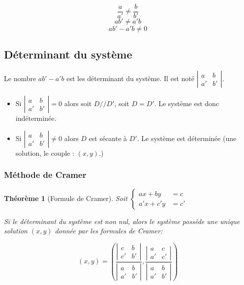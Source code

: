 \documentclass[a4paper,10pt]{report}
\newtheorem{theo}{Théorème}
\begin{document}
$$\frac{a}{a'} \neq \frac{b}{b'}$$
$$ab' \neq a'b$$
$$ab' - a'b \neq 0$$

\subsection{Déterminant du système}
Le nombre $ab' - a'b$ est les déterminant du système. Il est noté $\left| \begin{matrix}
a & b \\
a' & b'
\end{matrix} \right|$.
\begin{itemize}
\item{
Si $\left| \begin{matrix}
a & b \\
a' & b'
\end{matrix} \right| = 0$ alors soit $D // D'$, soit $D = D'$. Le système est donc indéterminée.}
\item{
Si $\left| \begin{matrix}
a & b \\
a' & b'
\end{matrix} \right| \neq 0$ alors $D$ est sécante à $D'$. Le système est déterminée (une solution, le couple : $(x,y)$.)}
\end{itemize}

\subsubsection{Méthode de Cramer}

\begin{theo}[Formule de Cramer]
Soit $\left\{\begin{array}{ll}
 ax+by & = c\\
 a'x+c'y & = c'
 \end{array}\right.$

Si le déterminant du système est non nul, alors le système possède une unique solution $(x,y)$ donnée par les formules de Cramer:

$$(x,y)=\left(\frac{\left| \begin{matrix}
c & b \\
c' & b'
\end{matrix} \right|}{\left| \begin{matrix}
a & b \\
a' & b'
\end{matrix} \right|},\frac{\left| \begin{matrix}
a & c \\
a' & c'
\end{matrix} \right|}{\left| \begin{matrix}
a & b \\
a' & b'
\end{matrix} \right|}\right)$$
\end{theo}
\end{document}
